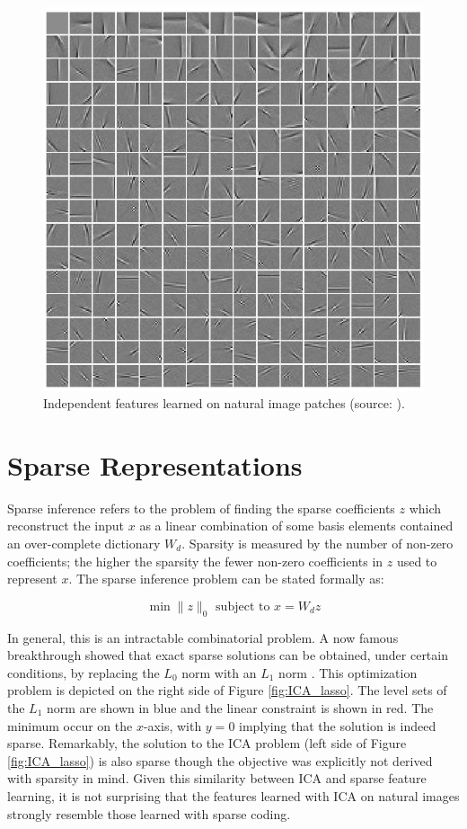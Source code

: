 \begin{figure} 
\centering
\includegraphics[scale=0.4]{./figures/related_work/ICABasis.png} 
\caption{Independent features learned on natural image patches (source: \cite{ICA}).}
\label{fig:ICA_features} 
\end{figure} 

\section{Sparse Representations} 
Sparse inference refers to the problem of finding the sparse coefficients $z$ which
reconstruct the input $x$ as a linear combination of some basis elements
contained an over-complete dictionary $W_d$. Sparsity is measured by the number
of non-zero coefficients; the higher the sparsity the fewer non-zero
coefficients in $z$ used to represent $x$.  
The sparse inference problem can be stated formally as: 

\begin{equation} 
\min \|z\|_0 \mbox{ subject to } x = W_dz 
\end{equation} 

In general, this is an intractable combinatorial problem. A now famous
breakthrough showed that exact sparse solutions can be obtained, under certain
conditions, by replacing the $L_0$ norm with an $L_1$ norm \cite{candes2006}.
This optimization problem is depicted on the right side of Figure
\ref{fig:ICA_lasso}.  The level sets of the $L_1$ norm are shown in blue and
the linear constraint is shown in red. The minimum occur on the $x$-axis, with
$y=0$ implying that the solution is indeed sparse. Remarkably, the solution to
the ICA problem (left side of Figure \ref{fig:ICA_lasso}) is also sparse though the
objective was explicitly not derived with sparsity in mind. Given this similarity 
between ICA and sparse feature learning, it is not surprising that the features 
learned with ICA on natural images strongly resemble those learned with sparse coding. 

